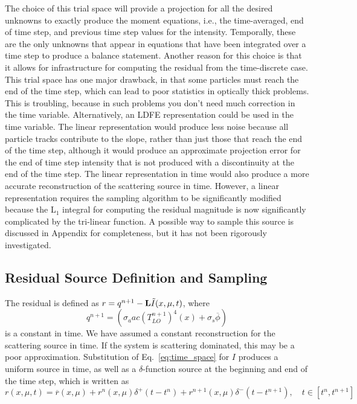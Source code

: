 The choice of this trial space will provide a projection for all the desired unknowns to exactly produce the moment
equations, i.e., the time-averaged, end of time step, and previous time step values for
the intensity.  Temporally, these are the only unknowns that appear in equations that have
been integrated over a time step to produce a balance statement.  Another reason for this
choice is that it allows for infrastructure for computing the residual from the
time-discrete case.  This trial space has one major drawback, in that some particles must
reach the end of the time step, which can lead to poor statistics in optically thick
problems.  This is troubling, because in such problems you don't need much correction in
the time variable.  Alternatively, an LDFE representation could be used in the time
variable. The linear representation would produce less noise because all particle tracks
contribute to the slope, rather than just those that reach the end of the time step,
although it would produce an approximate projection error for the end of time step
intensity that is not produced with a discontinuity at the end of the time step.  The
linear representation in time would also produce a more accurate reconstruction of the
scattering source in time.  However, a linear representation requires the sampling
algorithm to be significantly modified because the L$_1$ integral for computing the
residual magnitude is now significantly complicated by the tri-linear function.  A
possible way to sample this source is discussed in Appendix for completeness, but it has
not been rigorously investigated.

\subsection{Residual Source Definition and Sampling}

The residual is defined as $r = q^{n+1} - \mathbf{L} \tilde I(x,\mu,t)$, where
\begin{equation}
    q^{n+1}=\left(\sigma_a a c (T_{LO}^{n+1})^4(x) + \sigma_s\overline\phi\right)
\end{equation}
is a constant in time. We have assumed a constant reconstruction for the scattering source
in time.  If the system is scattering dominated, this may be a poor approximation. 
Substitution of Eq.~\eqref{eq:time_space} for $I$
produces a uniform source in time, as well as a $\delta$-function source at the
beginning and end of the time step, which is written as
\begin{equation}
    r(x,\mu,t) = \overline r(x,\mu)  + r^{n}(x,\mu)\delta^+(t-t^{n}) +
    r^{n+1}(x,\mu)\delta^-(t - t^{n+1}),
    \quad t\in[t^{n},t^{n+1}]
\end{equation}

